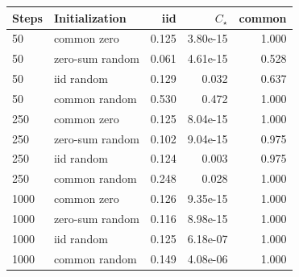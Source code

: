 \begin{tabular}{llrrr}
\toprule
Steps & Initialization & iid & $C_\star$ & common \\
\midrule
50 & common zero & 0.125 & 3.80e-15 & 1.000 \\
50 & zero-sum random & 0.061 & 4.61e-15 & 0.528 \\
50 & iid random & 0.129 & 0.032 & 0.637 \\
50 & common random & 0.530 & 0.472 & 1.000 \\
250 & common zero & 0.125 & 8.04e-15 & 1.000 \\
250 & zero-sum random & 0.102 & 9.04e-15 & 0.975 \\
250 & iid random & 0.124 & 0.003 & 0.975 \\
250 & common random & 0.248 & 0.028 & 1.000 \\
1000 & common zero & 0.126 & 9.35e-15 & 1.000 \\
1000 & zero-sum random & 0.116 & 8.98e-15 & 1.000 \\
1000 & iid random & 0.125 & 6.18e-07 & 1.000 \\
1000 & common random & 0.149 & 4.08e-06 & 1.000 \\
\bottomrule
\end{tabular}
